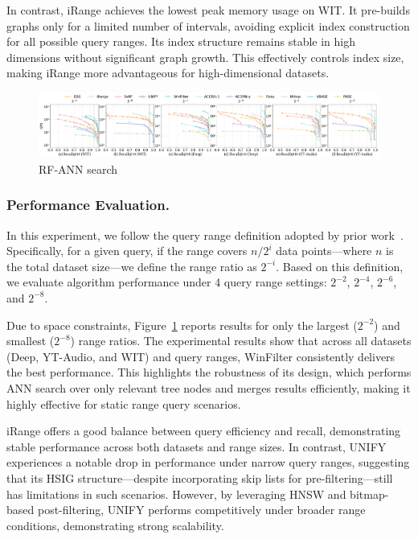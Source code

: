 \documentclass[sigconf, nonacm]{acmart}
\begin{document}
	In contrast, iRange achieves the lowest peak memory usage on WIT. It pre-builds graphs only for a limited number of intervals, avoiding explicit index construction for all possible query ranges. Its index structure remains stable in high dimensions without significant graph growth. This effectively controls index size, making iRange more advantageous for high-dimensional datasets.
	
	\begin{figure}[htbp]
		\centering
		\includegraphics[width=\textwidth]{figures/exp/exp_8_2.pdf}
		\caption{RF-ANN search }
		\label{fig:exp_8_2}
	\end{figure}
	
	
	\subsubsection{Performance Evaluation. }
	
	In this experiment, we follow the query range definition adopted by prior work~\cite{HQI}. Specifically, for a given query, if the range covers $n/2^i$ data points—where $n$ is the total dataset size—we define the range ratio as $2^{-i}$. Based on this definition, we evaluate algorithm performance under 4 query range settings: $2^{-2}$, $2^{-4}$, $2^{-6}$, and $2^{-8}$.
	
	Due to space constraints, Figure~\ref{fig:exp_8_2} reports results for only the largest ($2^{-2}$) and smallest ($2^{-8}$) range ratios. The experimental results show that across all datasets (Deep, YT-Audio, and WIT) and query ranges, WinFilter consistently delivers the best performance. This highlights the robustness of its design, which performs ANN search over only relevant tree nodes and merges results efficiently, making it highly effective for static range query scenarios.
	
	iRange offers a good balance between query efficiency and recall, demonstrating stable performance across both datasets and range sizes. In contrast, UNIFY experiences a notable drop in performance under narrow query ranges, suggesting that its HSIG structure—despite incorporating skip lists for pre-filtering—still has limitations in such scenarios. However, by leveraging HNSW and bitmap-based post-filtering, UNIFY performs competitively under broader range conditions, demonstrating strong scalability.
	
\end{document}
